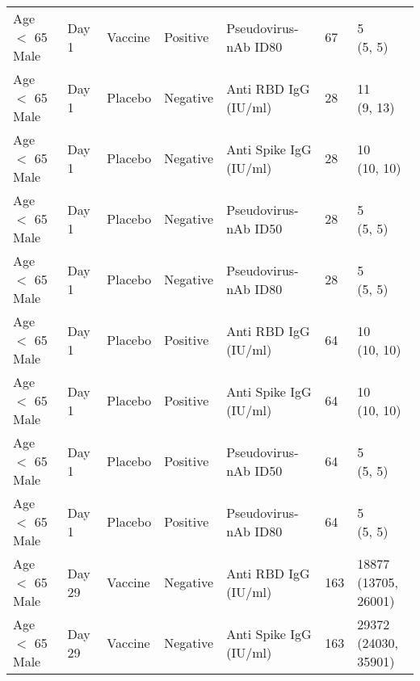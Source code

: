 \documentclass[]{book}
\theoremstyle{definition}
\theoremstyle{definition}
\theoremstyle{definition}
\newcommand{\1}{\mathbbm{1}}
\begin{document}
\begin{landscape}
\begin{ThreePartTable}
\begin{longtable}[t]{>{\raggedright\arraybackslash}p{7cm}llllll}
\hspace{1em}Age $<$ 65 Male & Day 1 & Vaccine & Positive & Pseudovirus-nAb ID80 & 67 & \makecell[l]{5\\(5, 5)}\\
\hspace{1em}Age $<$ 65 Male & Day 1 & Placebo & Negative & Anti RBD IgG (IU/ml) & 28 & \makecell[l]{11\\(9, 13)}\\
\hspace{1em}Age $<$ 65 Male & Day 1 & Placebo & Negative & Anti Spike IgG (IU/ml) & 28 & \makecell[l]{10\\(10, 10)}\\
\hspace{1em}Age $<$ 65 Male & Day 1 & Placebo & Negative & Pseudovirus-nAb ID50 & 28 & \makecell[l]{5\\(5, 5)}\\
\hspace{1em}Age $<$ 65 Male & Day 1 & Placebo & Negative & Pseudovirus-nAb ID80 & 28 & \makecell[l]{5\\(5, 5)}\\
\hspace{1em}Age $<$ 65 Male & Day 1 & Placebo & Positive & Anti RBD IgG (IU/ml) & 64 & \makecell[l]{10\\(10, 10)}\\
\hspace{1em}Age $<$ 65 Male & Day 1 & Placebo & Positive & Anti Spike IgG (IU/ml) & 64 & \makecell[l]{10\\(10, 10)}\\
\hspace{1em}Age $<$ 65 Male & Day 1 & Placebo & Positive & Pseudovirus-nAb ID50 & 64 & \makecell[l]{5\\(5, 5)}\\
\hspace{1em}Age $<$ 65 Male & Day 1 & Placebo & Positive & Pseudovirus-nAb ID80 & 64 & \makecell[l]{5\\(5, 5)}\\
\hspace{1em}Age $<$ 65 Male & Day 29 & Vaccine & Negative & Anti RBD IgG (IU/ml) & 163 & \makecell[l]{18877\\(13705, 26001)}\\
\hspace{1em}Age $<$ 65 Male & Day 29 & Vaccine & Negative & Anti Spike IgG (IU/ml) & 163 & \makecell[l]{29372\\(24030, 35901)}\\

\end{longtable}
\end{ThreePartTable}
\end{landscape}
\end{document}
